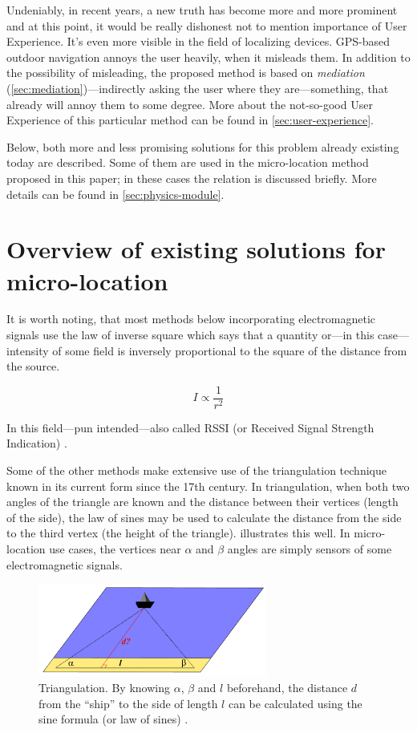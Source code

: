 Undeniably, in recent years, a new truth has become more and more prominent and at this point, it would be really dishonest not to mention importance of User Experience. It's even more visible in the field of localizing devices. GPS-based outdoor navigation annoys the user heavily, when it misleads them. In addition to the possibility of misleading, the proposed method is based on \emph{mediation} (\cref{sec:mediation})---indirectly asking the user where they are---something, that already will annoy them to some degree. More about the not-so-good User Experience of this particular method can be found in \cref{sec:user-experience}.

Below, both more and less promising solutions for this problem already existing today are described. Some of them are used in the micro-location method proposed in this paper; in these cases the relation is discussed briefly. More details can be found in \cref{sec:physics-module}.

\section{Overview of existing solutions for micro-location}
\label{sec:existing-uloc}

It is worth noting, that most methods below incorporating electromagnetic signals use the law of inverse square which says that a quantity or---in this case---intensity of some field is inversely proportional to the square of the distance from the source.

\begin{equation}
	\label{eq:inverse-sq}
	I \propto \frac{1}{r^2}
\end{equation}

In this field---pun intended---also called RSSI (or Received Signal Strength Indication) \cite{Gough:RSSI}.

Some of the other methods make extensive use of the triangulation technique known in its current form since the 17th century. In triangulation, when both two angles of the triangle are known and the distance between their vertices (length of the side), the law of sines may be used to calculate the distance from the side to the third vertex (the height of the triangle).  illustrates this well. In micro-location use cases, the vertices near $\alpha$ and $\beta$ angles are simply sensors of some electromagnetic signals.

\begin{figure}[h]
	\centering
	\includegraphics[width=0.67\textwidth]{triangulation}
	\caption{Triangulation. By knowing $\alpha$, $\beta$ and $l$ beforehand, the distance $d$ from the ``ship'' to the side of length $l$ can be calculated using the sine formula (or law of sines) \cite{wiki:triangulation}.}
	\label{fig:triangulation}
\end{figure}

